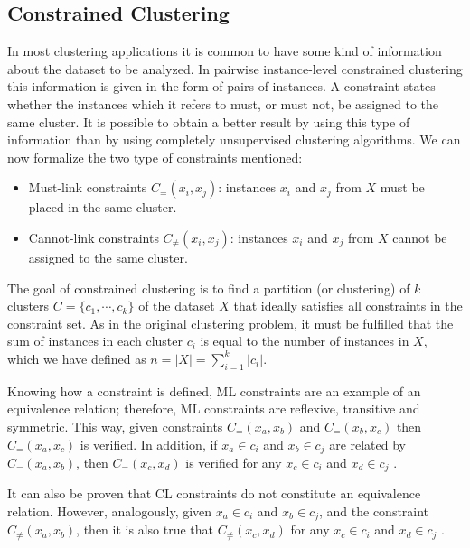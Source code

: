 \documentclass[review]{elsarticle}
\begin{document}
\subsection{Constrained Clustering} \label{sec:BackCC}

In most clustering applications it is common to have some kind of information about the dataset to be analyzed. In pairwise instance-level constrained clustering this information is given in the form of pairs of instances. A constraint states whether the instances which it refers to must, or must not, be assigned to the same cluster. It is possible to obtain a better result by using this type of information than by using completely unsupervised clustering algorithms. We can now formalize the two type of constraints mentioned: 

\begin{itemize}

	\item Must-link constraints $C_=(x_i,x_j)$: instances $x_i$ and $x_j$ from $X$ must be placed in the same cluster.

	\item Cannot-link constraints $C_{\neq}(x_i,x_j)$: instances $x_i$ and $x_j$ from $X$ cannot be assigned to the same cluster.

\end{itemize}

The goal of constrained clustering is to find a partition (or clustering) of $k$ clusters $C = \{c_1, \cdots, c_k\}$ of the dataset $X$ that ideally satisfies all constraints in the constraint set. As in the original clustering problem, it must be fulfilled that the sum of instances in each cluster $c_i$ is equal to the number of instances in $X$, which we have defined as $n = |X| = \sum_{i = 1}^{k} |c_i|$.

Knowing how a constraint is defined, ML constraints are an example of an equivalence relation; therefore, ML constraints are reflexive, transitive and symmetric. This way, given constraints $C_=(x_a,x_b)$ and $C_=(x_b,x_c)$ then $C_=(x_a,x_c)$ is verified. In addition, if $x_a \in c_i$ and $x_b \in c_j$ are related by $C_=(x_a,x_b)$, then $C_=(x_c,x_d)$ is verified for any $x_c \in c_i$ and $x_d \in c_j$ \cite{davidson2007survey}.

It can also be proven that CL constraints do not constitute an equivalence relation. However, analogously, given $x_a \in c_i$ and $x_b \in c_j$, and the constraint $C_{\neq}(x_a,x_b)$, then it is also true that $C_{\neq}(x_c,x_d)$ for any $x_c \in c_i$ and $x_d \in c_j$ \cite{davidson2007survey}.
\end{document}
